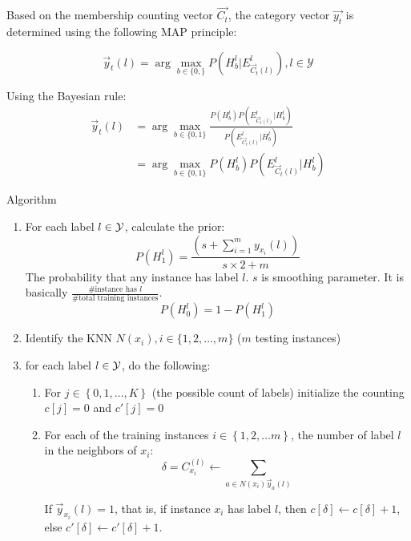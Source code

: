 Based on the membership counting vector $\vec{C_t}$, the category vector
$\vec{y_t}$ is determined using the following MAP principle:

\[ 
    \vec{y}_t(l) = \arg\max_{b\in \{0, \}} P(H_b^l|E_{\vec{C}_t(l)}^l), l
    \in \mathcal{Y}
\]

Using the Bayesian rule:
\begin{align*}
    \vec{y}_t(l) &= \arg\max_{b\in \{0, 1\}} \frac{P(H_b^l)
        P(E^l_{\vec{C}_t(l)}|H_b^l)}{P(E_{\vec{C}_t(l)}^l|H_b^l)} \\
        &= \arg\max_{b \in \{0, 1\}} P(H_b^l)P(E_{\vec{C}_t(l)}^l|H_b^l)
\end{align*}

Algorithm
\begin{enumerate}
    \item For each label $l \in \mathcal{Y}$, calculate the prior:
        \[P(H_1^l) = \frac{(s + \sum_{i=1}^m y_{x_i}(l))}{s \times 2 +
        m}\]
        The probability that any instance has label $l$. $s$ is smoothing
        parameter. It is basically $\frac{\#\mbox{instance has
        }l}{\#\mbox{total training instances}}$.
        \[ P(H_0^l) = 1 - P(H_1^l)\]
    \item Identify the KNN $N(x_i), i \in \{1, 2, \dots, m\}$ ($m$ testing
        instances)
    \item for each label $l \in \mathcal{Y}$, do the following:
        \begin{enumerate}
            \item For $j \in \left\{ 0, 1,
                \dots, K \right\}$ (the possible count of labels) initialize the counting $c[j] = 0$ and
                $c'[j] = 0$
            \item For each of the training instances $i \in \left\{ 1, 2,
                \dots m \right\}$, the number of label $l$ in the
                neighbors of $x_i$:
                \[ \delta = C_{x_i}^(l) \leftarrow \sum_{a\in
                N(x_i)\vec{y}_a(l)}\]

                If $\vec{y}_{x_i}(l) =  1$, that is, if instance $x_i$
                has label $l$,  then $c[\delta] \leftarrow
                c[\delta] + 1$, else $c'[\delta] \leftarrow c'[\delta]
                + 1$.


\end{enumerate}
\end{enumerate}
